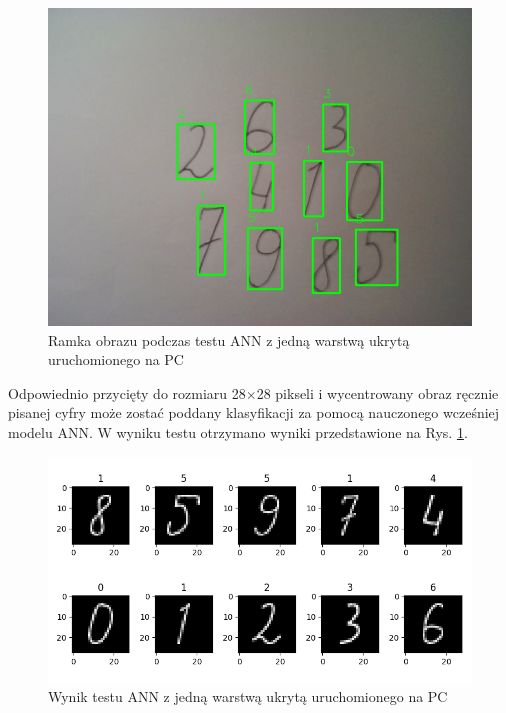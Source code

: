 \begin{figure}[!h]
    \centering
    \includegraphics[width=\textwidth]{img/1hid-layer-pc-img.png}
    \caption{Ramka obrazu podczas testu ANN z jedną warstwą ukrytą uruchomionego na PC}
    \label{1hid-layer-pc-img}
  \end{figure}

Odpowiednio przycięty do rozmiaru 28$\times$28 pikseli i wycentrowany obraz ręcznie pisanej cyfry może 
zostać poddany klasyfikacji za pomocą nauczonego wcześniej modelu ANN. W wyniku testu otrzymano 
wyniki przedstawione na Rys. \ref{1hid-layer-pc-img}. 

\begin{figure}[!h]
    \centering
    \includegraphics[width=\textwidth]{img/1hid-layer-pc-plot.png}
    \caption{Wynik testu ANN z jedną warstwą ukrytą uruchomionego na PC}
    \label{1hid-layer-pc-plot}
\end{figure}


